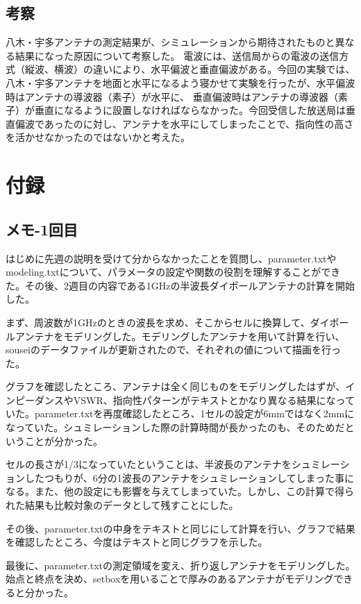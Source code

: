 \documentclass[dvipdfmx,autodetect-engine,titlepage]{jsarticle}
\begin{document}
\subsection{考察}
八木・宇多アンテナの測定結果が、シミュレーションから期待されたものと異なる結果になった原因について考察した。
電波には、送信局からの電波の送信方式（縦波、横波）の違いにより、水平偏波と垂直偏波がある。今回の実験では、八木・宇多アンテナを地面と水平になるよう寝かせて実験を行ったが、水平偏波時はアンテナの導波器（素子）が水平に、
垂直偏波時はアンテナの導波器（素子）が垂直になるように設置しなければならなかった。今回受信した放送局は垂直偏波であったのに対し、アンテナを水平にしてしまったことで、指向性の高さを活かせなかったのではないかと考えた。\\

\section{付録}
\subsection{メモ-1回目}
はじめに先週の説明を受けて分からなかったことを質問し、parameter.txtやmodeling.txtについて、パラメータの設定や関数の役割を理解することができた。その後、2週目の内容である1GHzの半波長ダイポールアンテナの計算を開始した。

まず、周波数が1GHzのときの波長を求め、そこからセルに換算して、ダイポールアンテナをモデリングした。モデリングしたアンテナを用いて計算を行い、souseiのデータファイルが更新されたので、それぞれの値について描画を行った。

グラフを確認したところ、アンテナは全く同じものをモデリングしたはずが、インピーダンスやVSWR、指向性パターンがテキストとかなり異なる結果になっていた。parameter.txtを再度確認したところ、1セルの設定が6mmではなく2mmになっていた。シュミレーションした際の計算時間が長かったのも、そのためだということが分かった。

セルの長さが1/3になっていたということは、半波長のアンテナをシュミレーションしたつもりが、6分の1波長のアンテナをシュミレーションしてしまった事になる。また、他の設定にも影響を与えてしまっていた。しかし、この計算で得られた結果も比較対象のデータとして残すことにした。

その後、parameter.txtの中身をテキストと同じにして計算を行い、グラフで結果を確認したところ、今度はテキストと同じグラフを示した。

最後に、parameter.txtの測定領域を変え、折り返しアンテナをモデリングした。始点と終点を決め、setboxを用いることで厚みのあるアンテナがモデリングできると分かった。
\end{document}

